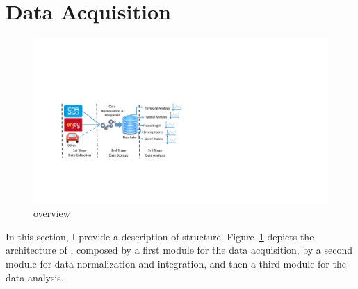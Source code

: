 %
%
%
%
%
%
%


\section{Data Acquisition}
\label{sec:2_3_data_acquisition}
\begin{figure}[h!]
\centering
 \includegraphics[trim=3cm 4.5cm 17cm 7.2cm,clip, width=0.95\columnwidth]{figures/framework_schema.pdf}
 \caption{\tool overview\label{fig:c2_framework}}
\end{figure}


In this section, I provide a description of \tool structure. Figure~\ref{fig:c2_framework} depicts the architecture of \tool, composed by a first module for the data acquisition, by a second module for data normalization and integration, and then a third  module for the data analysis.

